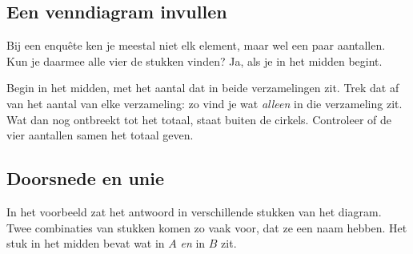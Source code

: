 \subsection{Een venndiagram invullen}

Bij een enquête ken je meestal niet elk element, maar wel een paar aantallen. Kun je daarmee alle vier de stukken vinden? Ja, als je in het midden begint.


\begin{werkwijze}
Begin in het midden, met het aantal dat in beide verzamelingen zit. Trek dat af van het aantal van elke verzameling: zo vind je wat \textit{alleen} in die verzameling zit. Wat dan nog ontbreekt tot het totaal, staat buiten de cirkels. Controleer of de vier aantallen samen het totaal geven.
\end{werkwijze}

\begin{oefeningen}
\end{oefeningen}

\subsection{Doorsnede en unie}

In het voorbeeld zat het antwoord in verschillende stukken van het diagram. Twee combinaties van stukken komen zo vaak voor, dat ze een naam hebben. Het stuk in het midden bevat wat in $A$ \textit{en} in $B$ zit.

